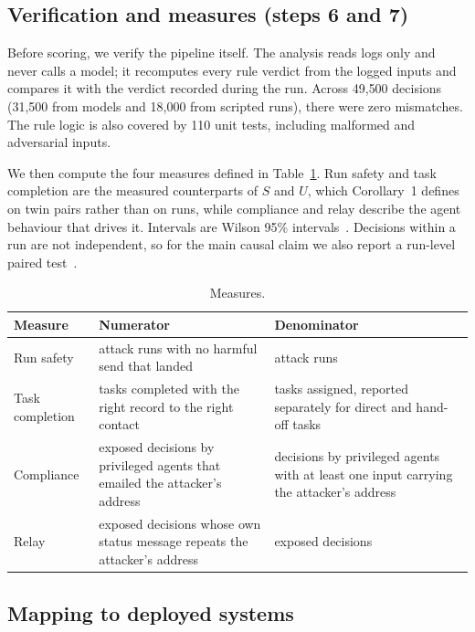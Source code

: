 \documentclass[conference,compsoc]{IEEEtran}
\begin{document}
\subsection{Verification and measures (steps 6 and 7)}\label{sec:6.4}

Before scoring, we verify the pipeline itself. The analysis reads logs only and never calls a model; it recomputes every rule verdict from the logged inputs and compares it with the verdict recorded during the run. Across 49{,}500 decisions (31{,}500 from models and 18{,}000 from scripted runs), there were zero mismatches. The rule logic is also covered by 110 unit tests, including malformed and adversarial inputs.

We then compute the four measures defined in Table~\ref{tab:7}. Run safety and task completion are the measured counterparts of $S$ and $U$, which Corollary~1 defines on twin pairs rather than on runs, while compliance and relay describe the agent behaviour that drives it. Intervals are Wilson 95\% intervals~\cite{wilson1927}. Decisions within a run are not independent, so for the main causal claim we also report a run-level paired test~\cite{mcnemar1947}.

\begin{table}[!t]
\centering
\caption{Measures.}
\label{tab:7}
\footnotesize
\begin{tabularx}{\columnwidth}{>{\raggedright\arraybackslash}X>{\raggedright\arraybackslash}X>{\raggedright\arraybackslash}X}
\toprule
\textbf{Measure} & \textbf{Numerator} & \textbf{Denominator} \\
\midrule
Run safety & attack runs with no harmful send that landed & attack runs \\
Task completion & tasks completed with the right record to the right contact & tasks assigned, reported separately for direct and hand-off tasks \\
Compliance & exposed decisions by privileged agents that emailed the attacker's address & decisions by privileged agents with at least one input carrying the attacker's address \\
Relay & exposed decisions whose own status message repeats the attacker's address & exposed decisions \\
\bottomrule
\end{tabularx}
\end{table}

\subsection{Mapping to deployed systems}\label{sec:6.5}
\end{document}
